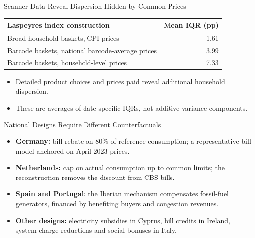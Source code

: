 \documentclass[11pt,aspectratio=169]{beamer}
\begin{document}
\begin{frame}{Scanner Data Reveal Dispersion Hidden by Common Prices}
\par\vspace{.7em}
\centering\small\renewcommand{\arraystretch}{1.45}
\begin{tabular}{lr}
\toprule
Laspeyres index construction & Mean IQR (pp)\\
\midrule
Broad household baskets, CPI prices & 1.61\\
Barcode baskets, national barcode-average prices & 3.99\\
Barcode baskets, household-level prices & 7.33\\
\bottomrule
\end{tabular}
\par\vspace{.8em}\raggedright
\begin{itemize}
\item Detailed product choices and prices paid reveal additional household dispersion.
\item These are averages of date-specific IQRs, not additive variance components.
\end{itemize}
\end{frame}



\begin{frame}{National Designs Require Different Counterfactuals}
\small
\begin{itemize}
\item \textbf{Germany:} bill rebate on 80\% of reference consumption; a representative-bill model anchored on April 2023 prices.
\item \textbf{Netherlands:} cap on actual consumption up to common limits; the reconstruction removes the discount from CBS bills.
\item \textbf{Spain and Portugal:} the Iberian mechanism compensates fossil-fuel generators, financed by benefiting buyers and congestion revenues.
\item \textbf{Other designs:} electricity subsidies in Cyprus, bill credits in Ireland, system-charge reductions and social bonuses in Italy.
\end{itemize}
\end{frame}
\end{document}
